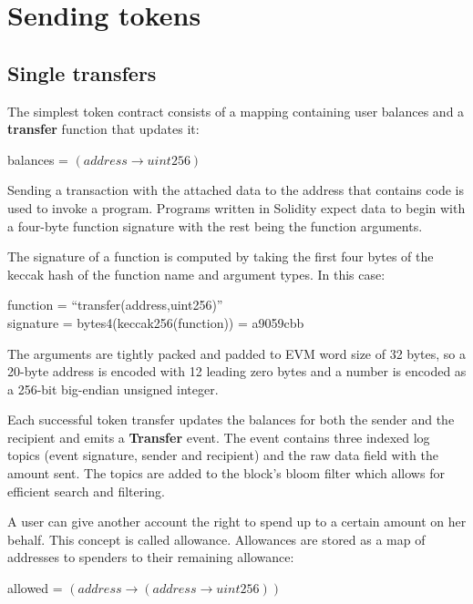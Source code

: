 \documentclass[12pt]{article}
\begin{document}
\section{Sending tokens}
\subsection{Single transfers}
The simplest token contract consists of a mapping containing user balances and a \textbf{transfer} function that updates it:
%
\begin{center}
	balances = $(address \rightarrow uint256)$
\end{center}
%
Sending a transaction with the attached data to the address that contains code is used to invoke a program.
Programs written in Solidity expect data to begin with a four-byte function signature with the rest being the function arguments.

The signature of a function is computed by taking the first four bytes of the keccak hash of the function name and argument types. In this case:
\begin{center}
	function = ``transfer(address,uint256)'' \\
	signature = bytes4(keccak256(function)) = a9059cbb
\end{center}

The arguments are tightly packed and padded to EVM word size of 32 bytes, so a 20-byte address is encoded with 12 leading zero bytes and a number is encoded as a 256-bit big-endian unsigned integer.

Each successful token transfer updates the balances for both the sender and the recipient and emits a \textbf{Transfer} event.
The event contains three indexed log topics (event signature, sender and recipient) and the raw data field with the amount sent.
The topics are added to the block's bloom filter which allows for efficient search and filtering.


A user can give another account the right to spend up to a certain amount on her behalf. This concept is called allowance.
Allowances are stored as a map of addresses to spenders to their remaining allowance:
\begin{center}
	allowed = $(address \rightarrow (address \rightarrow uint256))$
\end{center}
\end{document}
